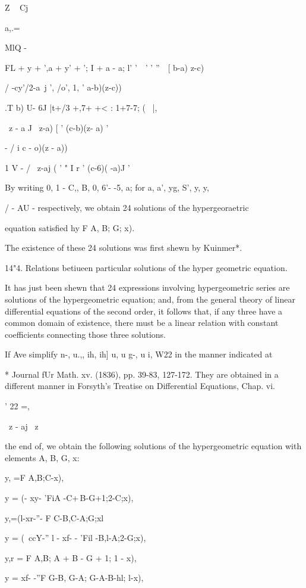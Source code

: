 %
%

Z ~ Cj

a,.=

MlQ -

FL + y + ',a + y' + '; I + a - a; l' '\ \ ' ' ''\ \, [ b-a) z-c)

/ -cy'/2-a\ j ', /o', 1, ' a-b)(z-c))

.T b) U- 6J |t+/3 +,7+ +< : 1+7-7; \;( \ |,

\ z - a J \ z-a) [ ' (c-b)(z- a) '

- / i c - o)(z - a))

1 V - / \ z-aj ( ' " I r ' (c-6)( -a)J '

By writing 0, 1 - C,, B, 0, 6'- -5, a; for a, a', yg, S', y, y,

/ - AU - respectively, we obtain 24 solutions of the hypergeoraetric

equation satisfied hy F A, B; G; x).

The existence of these 24 solutions was first shewn by Kuinmer*.

14"4. Relations betiueen particular solutions of the hyper geometric
equation.

It has just been shewn that 24 expressions involving hypergeometric
series are solutions of the hypergeometric equation; and, from the
general theory of linear differential equations of the second order,
it follows that, if any three have a common domain of existence, there
must be a linear relation with constant coefficients connecting those
three solutions.

If Ave simplify n-, u.,, ih, ih] u, u g-, u i, W22 in the manner
indicated at

* Journal fUr Math. xv. (1836), pp. 39-83, 127-172. They are obtained
in a different manner in Forsyth's Treatise on Differential Equations,
Chap. vi.

' 22 =,

\ z - aj \ z

%
%

the end of, we obtain the following solutions of the
hypergeometric equation with elements A, B, G, x:

y, =F A,B;C-x),

y = (- xy- 'FiA -C+\,B-G+1;2-C;x),

y,=(l-xr-''- F C-B,C-A;G;xl

y = (\ ccY-'' l - xf- - 'Fil -B,l-A;2-G;x),

y,r = F A,B; A + B - G + 1; 1 - x),

y = xf- -''F G-B, G-A; G-A-B-hl; l-x),

